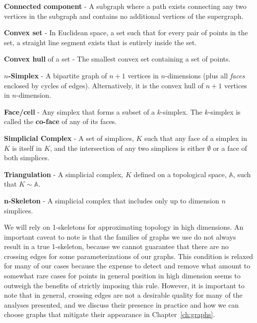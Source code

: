 \begin{defn}
  \textbf{Connected component} - A subgraph where a path exists connecting
  any two vertices in the subgraph and contains no additional vertices of the
  supergraph.
\end{defn}

\begin{defn}
  \textbf{Convex set} - In Euclidean space, a set such that for every pair of points in the set, a straight line segment exists that is entirely inside the set.
\end{defn}

\begin{defn}
  \textbf{Convex hull} of a set - The smallest convex set containing a set of points.
\end{defn}

\begin{defn}
  \textbf{$n$-Simplex} - A bipartite graph of $n+1$ vertices in $n$-dimensions
   (plus all \emph{faces} enclosed by cycles of edges).
  Alternatively, it is the convex hull of $n+1$ vertices in $n$-dimension.
\end{defn}

\begin{defn}
  \textbf{Face/cell} - Any simplex that forms a subset of a $k$-simplex.
  The $k$-simplex is called the \textbf{co-face} of any of its faces.
\end{defn}

\begin{defn}
  \textbf{Simplicial Complex} - A set of simplices, $K$ such that any face of
  a simplex in $K$ is itself in $K$, and the intersection of any two simplices
  is either $\emptyset$ or a face of both simplices.
\end{defn}

\begin{defn}
  \textbf{Triangulation} - A simplicial complex, $K$ defined on a topological
  space, $\mathbb{A}$, such that $K \sim \mathbb{A}$.
\end{defn}

\begin{defn}
  \textbf{n-Skeleton} - A simplicial complex that includes only up to dimension
  $n$ simplices.
\end{defn}

We will rely on 1-skeletons for approximating topology in high dimensions.
%
An important caveat to note is that the families of graphs we use do not always result in a true 1-skeleton, because we cannot guarantee that there are no crossing edges for some parameterizations of our graphs.
%
This condition is relaxed for many of our cases because the expense to detect and remove what amount to somewhat rare cases for points in general position in high dimension seems to outweigh the benefits of strictly imposing this rule.
%
However, it is important to note that in general, crossing edges are not a desirable quality for many of the analyses presented, and we discuss their presence in practice and how we can choose graphs that mitigate their appearance in Chapter~\ref{ch:graphs}.

